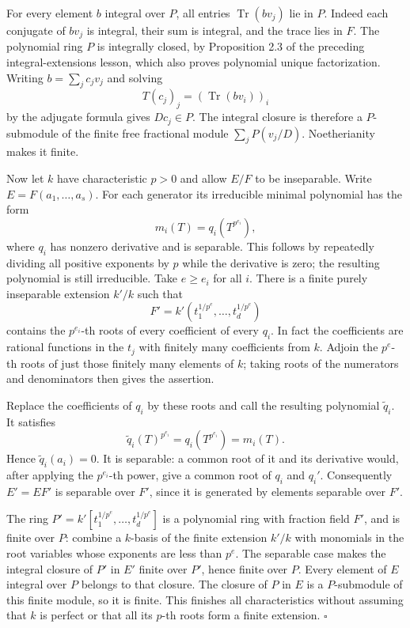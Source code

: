 \documentclass[
]{article}
\begin{document}
For every element \(b\) integral over \(P\), all entries
\(\operatorname{Tr}(bv_j)\) lie in \(P\). Indeed each conjugate of
\(bv_j\) is integral, their sum is integral, and the trace lies in
\(F\). The polynomial ring \(P\) is integrally closed, by Proposition
2.3 of the preceding integral-extensions lesson, which also proves
polynomial unique factorization. Writing \(b=\sum_j c_jv_j\) and solving
\[
T(c_j)_j=(\operatorname{Tr}(bv_i))_i
\] by the adjugate formula gives \(Dc_j\in P\). The integral closure is
therefore a \(P\)-submodule of the finite free fractional module
\(\sum_j P(v_j/D)\). Noetherianity makes it finite.

Now let \(k\) have characteristic \(p>0\) and allow \(E/F\) to be
inseparable. Write \(E=F(a_1,\ldots,a_s)\). For each generator its
irreducible minimal polynomial has the form \[
m_i(T)=q_i(T^{p^{e_i}}),
\] where \(q_i\) has nonzero derivative and is separable. This follows
by repeatedly dividing all positive exponents by \(p\) while the
derivative is zero; the resulting polynomial is still irreducible. Take
\(e\geq e_i\) for all \(i\). There is a finite purely inseparable
extension \(k'/k\) such that \[
F'=k'(t_1^{1/p^e},\ldots,t_d^{1/p^e})
\] contains the \(p^{e_i}\)-th roots of every coefficient of every
\(q_i\). In fact the coefficients are rational functions in the \(t_j\)
with finitely many coefficients from \(k\). Adjoin the \(p^e\)-th roots
of just those finitely many elements of \(k\); taking roots of the
numerators and denominators then gives the assertion.

Replace the coefficients of \(q_i\) by these roots and call the
resulting polynomial \(\widetilde q_i\). It satisfies \[
\widetilde q_i(T)^{p^{e_i}}=q_i(T^{p^{e_i}})=m_i(T).
\] Hence \(\widetilde q_i(a_i)=0\). It is separable: a common root of it
and its derivative would, after applying the \(p^{e_i}\)-th power, give
a common root of \(q_i\) and \(q_i'\). Consequently \(E'=EF'\) is
separable over \(F'\), since it is generated by elements separable over
\(F'\).

The ring \(P'=k'[t_1^{1/p^e},\ldots,t_d^{1/p^e}]\) is a polynomial ring
with fraction field \(F'\), and is finite over \(P\): combine a
\(k\)-basis of the finite extension \(k'/k\) with monomials in the root
variables whose exponents are less than \(p^e\). The separable case
makes the integral closure of \(P'\) in \(E'\) finite over \(P'\), hence
finite over \(P\). Every element of \(E\) integral over \(P\) belongs to
that closure. The closure of \(P\) in \(E\) is a \(P\)-submodule of this
finite module, so it is finite. This finishes all characteristics
without assuming that \(k\) is perfect or that all its \(p\)-th roots
form a finite extension. \(\square\)
\end{document}
